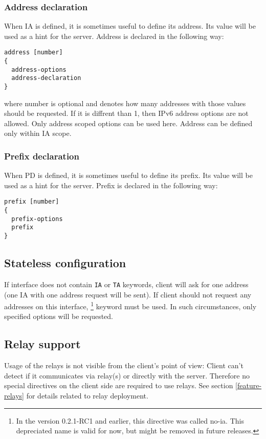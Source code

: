 \subsubsection{Address declaration}
\label{client-scope-addr}
When IA is defined, it is sometimes useful to define its address. Its
value will be used as a hint for the server. Address is declared in the
following way:

\begin{lstlisting}
address [number]
{
  address-options
  address-declaration
}
\end{lstlisting}
where number is optional and denotes how many addresses with those values should be
requested. If it is diffrent than 1, then IPv6 address options are not
allowed. Only address scoped options can be used here. Address can be
defined only within IA scope.

\subsubsection{Prefix declaration}
\label{client-scope-prefix}
When PD is defined, it is sometimes useful to define its prefix. Its
value will be used as a hint for the server. Prefix is declared in the
following way:

\begin{lstlisting}
prefix [number]
{
  prefix-options
  prefix
}
\end{lstlisting}

\subsection{Stateless configuration}

If interface does not contain \verb+IA+ or \verb+TA+ keywords, client
will ask for one address (one IA with one address request will be sent).
If client should not request any addresses on this interface,
\footnote{In the version 0.2.1-RC1 and earlier, this
  directive was called no-ia. This depreciated name is valid for now,
  but might be removed in future releases.} keyword must be used. In
such circumstances, only specified options will be requested.

\subsection{Relay support}
Usage of the relays is not visible from the client's point of view:
Client can't detect if it communicates via relay(s) or directly
with the server. Therefore no special directives on the client side
are required to use relays. See section \ref{feature-relays} for
details related to relay deployment.

